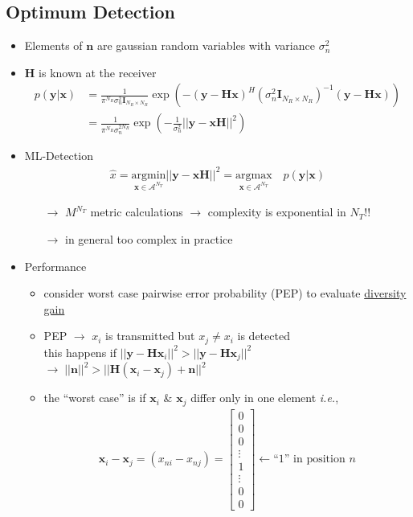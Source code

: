 \documentclass[a4paper, 10pt]{article}
\begin{document}
\subsection{Optimum Detection}
\begin{itemize}
	\item Elements of $\mathbf{n}$ are gaussian random variables with variance $\sigma_n^2$
	\item $\mathbf{H}$ is known at the receiver
	\begin{align*}
		p(\mathbf{y}|\mathbf{x})&=\frac{1}{\pi^{N_R}\sigma_n^2\mathbf{I}_{N_R \times N_R}} \exp \left(-(\mathbf{y}-\mathbf{Hx})^H(\sigma_n^2\mathbf{I}_{N_R \times N_R})^{-1}(\mathbf{y}-\mathbf{Hx})\right)\\
		&=\frac{1}{\pi^{N_R}\sigma_n^{2N_R}}\exp\left(-\frac{1}{\sigma_n^2}||\mathbf{y}-\mathbf{xH}||^2\right)
	\end{align*}
	\item ML-Detection
	\begin{align*}
		\hat{x}=\underset{\mathbf{x}\in \mathscr{A}^{N_T}}{\mathrm{argmin}}||\mathbf{y}-\mathbf{xH}||^2=\underset{\mathbf{x}\in \mathscr{A}^{N_T}}{\mathrm{argmax}}\quad p(\mathbf{y}|\mathbf{x})
	\end{align*}
	\begin{itemize}
		\item[$\rightarrow$] $M^{N_T}$ metric calculations $\rightarrow$ complexity is exponential in $N_T$!!
		\item[$\rightarrow$] in general too complex in practice
	\end{itemize}
	\item Performance 
	\begin{itemize}
		\item consider worst case pairwise error probability (PEP) to evaluate \underline{diversity gain}
		\item PEP $\rightarrow$ $x_i$ is transmitted but $x_j\neq x_i$ is detected\\
		this happens if $||\mathbf{y}-\mathbf{Hx}_i||^2 > ||\mathbf{y}-\mathbf{Hx}_j||^2$\\
		$\rightarrow\; ||\mathbf{n}||^2>||\mathbf{H}(\mathbf{x}_i-\mathbf{x}_j)+\mathbf{n}||^2$
		\item the ``worst case'' is if $\mathbf{x}_i$ \& $\mathbf{x}_j$ differ only in one element \textit{i.e.},
		\begin{align*}
			 \mathbf{x}_i-\mathbf{x}_j=(x_{ni}-x_{nj})= \begin{bmatrix*} 0 \\ 0 \\ 0 \\ \vdots \\  1 \\ \vdots \\ 0 \\ 0  \end{bmatrix*}\leftarrow \text{``1'' in position } n

\end{align*}
\end{itemize}
\end{itemize}
\end{document}
